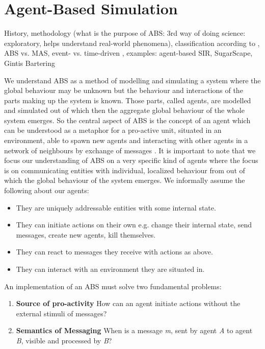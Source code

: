 \section{Agent-Based Simulation}
\label{sec:method_abs}

History, methodology (what is the purpose of ABS: 3rd way of doing science: exploratory, helps understand real-world phenomena), classification according to \cite{macal_everything_2016}, ABS vs. MAS, event- vs. time-driven \cite{meyer_event-driven_2014}, examples: agent-based SIR, SugarScape, Gintis Bartering

We understand ABS as a method of modelling and simulating a system where the global behaviour may be unknown but the behaviour and interactions of the parts making up the system is known. Those parts, called agents, are modelled and simulated out of which then the aggregate global behaviour of the whole system emerges. So the central aspect of ABS is the concept of an agent which can be understood as a metaphor for a pro-active unit, situated in an environment, able to spawn new agents and interacting with other agents in a network of neighbours by exchange of messages \cite{wooldridge_introduction_2009}. It is important to note that we focus our understanding of ABS on a very specific kind of agents where the focus is on communicating entities with individual, localized behaviour from out of which the global behaviour of the system emerges. We informally assume the following about our agents:

\begin{itemize}
	\item They are uniquely addressable entities with some internal state.
	\item They can initiate actions on their own e.g. change their internal state, send messages, create new agents, kill themselves.
	\item They can react to messages they receive with actions as above.
	\item They can interact with an environment they are situated in.
\end{itemize} 

An implementation of an ABS must solve two fundamental problems:

\begin{enumerate}
	\item \textbf{Source of pro-activity} How can an agent initiate actions without the external stimuli of messages?
	\item \textbf{Semantics of Messaging} When is a message \textit{m}, sent by agent \textit{A} to agent \textit{B}, visible and processed by \textit{B}?
\end{enumerate}

